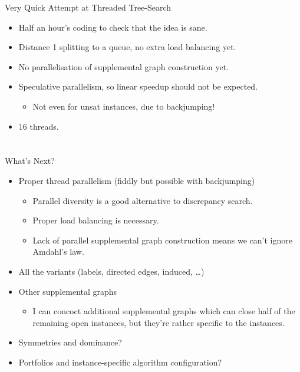 \documentclass{beamer}
\begin{document}
\begin{frame}{Very Quick Attempt at Threaded Tree-Search}
     {
        \begin{itemize}
            \item Half an hour's coding to check that the idea is sane.
            \item Distance 1 splitting to a queue, no extra load balancing yet.
            \item No parallelisation of supplemental graph construction yet.
            \item Speculative parallelism, so linear speedup should not be expected.
                \begin{itemize}
                    \item Not even for unsat instances, due to backjumping!
                \end{itemize}
            \item 16 threads.
        \end{itemize}
    }

     {
        
    }

     {
        
    }
\end{frame}

\section{}

\begin{frame}{What's Next?}
    \begin{itemize}
        \item Proper thread parallelism (fiddly but possible with backjumping)
            \begin{itemize}
                \item Parallel diversity is a good alternative to discrepancy search.
                \item Proper load balancing is necessary.
                \item Lack of parallel supplemental graph construction means we can't ignore
                    Amdahl's law.
            \end{itemize}
        \item All the variants (labels, directed edges, induced, \ldots)
        \item Other supplemental graphs
            \begin{itemize}
                \item I can concoct additional supplemental graphs which can close half of the
                    remaining open instances, but they're rather specific to the instances.
            \end{itemize}
        \item Symmetries and dominance?
        \item Portfolios and instance-specific algorithm configuration?
    \end{itemize}
\end{frame}
\end{document}
